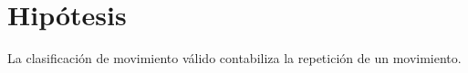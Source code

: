\section{Hip\'otesis}
La clasificaci\'on de movimiento v\'alido contabiliza la repetici\'on de un movimiento.